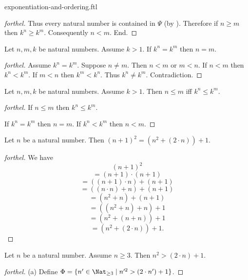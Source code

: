 \documentclass{naproche-library}
\begin{document}
\begin{smodule}[title=Exponentiation and Ordering]{exponentiation-and-ordering.ftl}
\begin{proof}[forthel]
    Thus every natural number is contained in $\Psi$ (by ).
    Therefore if $n \geq m$ then $k^{n} \geq k^{m}$.
    Consequently $n < m$.
  End.
\end{proof}

\begin{corollary}[forthel,id=ARITHMETIC_09_6780506905509888]
  Let $n, m, k$ be natural numbers.
  Assume $k > 1$.
  If $k^{n} = k^{m}$ then $n = m$.
\end{corollary}
\begin{proof}[forthel]
  Assume $k^{n} = k^{m}$.
  Suppose $n \neq m$.
  Then $n < m$ or $m < n$.
  If $n < m$ then $k^{n} < k^{m}$.
  If $m < n$ then $k^{m} < k^{n}$.
  Thus $k^{n} \neq k^{m}$.
  Contradiction.
\end{proof}

\begin{corollary}[forthel,id=ARITHMETIC_09_2876620253691904]
  Let $n, m, k$ be natural numbers.
  Assume $k > 1$.
  Then $n \leq m$ iff $k^{n} \leq k^{m}$.
\end{corollary}
\begin{proof}[forthel]
  If $n \leq m$ then $k^{n} \leq k^{m}$.

  If $k^{n} = k^{m}$ then $n = m$.
  If $k^{n} < k^{m}$ then $n < m$.
\end{proof}

\begin{proposition}[forthel,id=ARITHMETIC_09_6984104377581568]
  Let $n$ be a natural number.
  Then $(n + 1)^{2} = (n^{2} + (2 \cdot n)) + 1$.
\end{proposition}
\begin{proof}[forthel]
  We have
  \[  (n + 1)^{2}                       \]
  \[    = (n + 1) \cdot (n + 1)         \]
  \[    = ((n + 1) \cdot n) + (n + 1)   \]
  \[    = ((n \cdot n) + n) + (n + 1)   \]
  \[    = (n^{2} + n) + (n + 1)         \]
  \[    = ((n^{2} + n) + n) + 1         \]
  \[    = (n^{2} + (n + n)) + 1         \]
  \[    = (n^{2} + (2 \cdot n)) + 1.    \]
\end{proof}

\begin{proposition}[forthel,id=ARITHMETIC_09_134060414337024]
  Let $n$ be a natural number.
  Assume $n \geq 3$.
  Then $n^{2} > (2 \cdot n) + 1$.
\end{proposition}
\begin{proof}[forthel]
  (a) Define $\Phi = \{ n' \in \Nat_{\geq 3} \mid n'^{2} > (2 \cdot n') + 1 \}$.


\end{proof}
\end{smodule}
\end{document}
